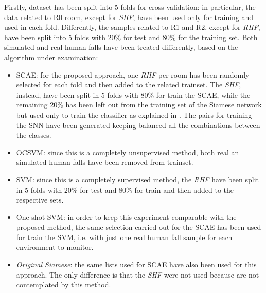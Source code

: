 Firstly, dataset has been split into 5 folds for cross-validation: in particular, the data related to R0 room, except for \textit{SHF}, have been used only for training and used in each fold. Differently, the samples related to R1 and R2, except for \textit{RHF}, have been split into 5 folds with 20\% for test and 80\% for the training set. Both simulated and real human falls have been treated differently, based on the algorithm under examination:
\begin{itemize}
	\item SCAE: for the proposed approach, one \textit{RHF} per room has been randomly selected for each fold and then added to the related trainset. The \textit{SHF}, instead, have been split in 5 folds with 80\% for train the SCAE, while the remaining 20\% has been left out from the training set of the Siamese network but used only to train the classifier as explained in  . The pairs for training the SNN have been generated keeping balanced all the combinations between the classes.
	\item OCSVM: since this is a completely unsupervised method, both real an simulated human falls have been removed from trainset.
	\item SVM: since this is a completely supervised method, the \textit{RHF} have been split in 5 folds with 20\% for test and 80\% for train and then added to the respective sets. 
	\item One-shot-SVM: in order to keep this experiment comparable with the proposed method, the same selection carried out for the SCAE has been used for train the SVM, i.e. with just one real human fall sample for each environment to monitor. 
	\item \textit{Original Siamese}: the same lists used for SCAE have also been used for this approach. The only difference is that the \textit{SHF} were not used because are not contemplated by this method.
	
\end{itemize}

